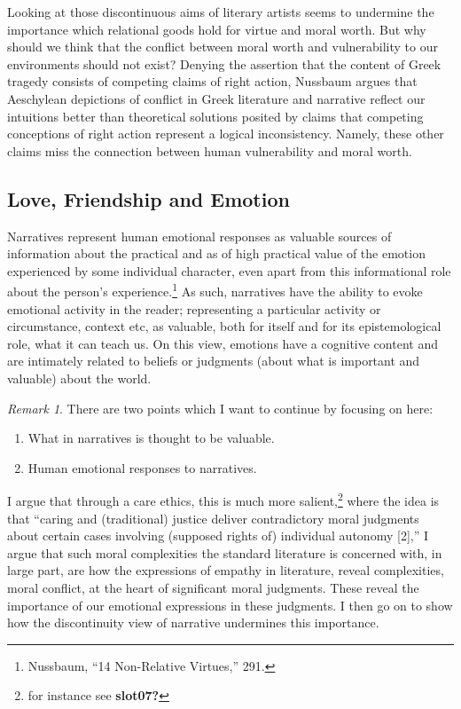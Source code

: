 \documentclass[
  12pt,
]{book}
\providecommand{\tightlist}{%
  \setlength{\itemsep}{0pt}\setlength{\parskip}{0pt}}
\providecommand{\tightlist}{%
  \setlength{\itemsep}{0pt}\setlength{\parskip}{0pt}}
\theoremstyle{definition}
\theoremstyle{definition}
\theoremstyle{definition}
\theoremstyle{definition}
\theoremstyle{remark}
\newtheorem*{remark}{Remark}
\begin{document}
Looking at those discontinuous aims of literary artists seems to undermine the importance which relational goods hold for virtue and moral worth. But why should we think that the conflict between moral worth and vulnerability to our environments should not exist? Denying the assertion that the content of Greek tragedy consists of competing claims of right action, Nussbaum argues that Aeschylean depictions of conflict in Greek literature and narrative reflect our intuitions better than theoretical solutions posited by claims that competing conceptions of right action represent a logical inconsistency. Namely, these other claims miss the connection between human vulnerability and moral worth.

\subsection*{Love, Friendship and Emotion}\label{love-friendship-and-emotion}

Narratives represent human emotional responses as valuable sources of information about the practical and as of high practical value of the emotion experienced by some individual character, even apart from this informational role about the person's experience.\footnote{Nussbaum, {``14 {Non-Relative Virtues},''} 291.} As such, narratives have the ability to evoke emotional activity in the reader; representing a particular activity or circumstance, context etc, as valuable, both for itself and for its epistemological role, what it can teach us. On this view, emotions have a cognitive content and are intimately related to beliefs or judgments (about what is important and valuable) about the world.

\begin{remark}

\noindent There are two points which I want to continue by focusing on here:

\begin{enumerate}
\def\labelenumi{\arabic{enumi}.}
\tightlist
\item
  What in narratives is thought to be valuable.
\item
  Human emotional responses to narratives.
\end{enumerate}

\end{remark}

I argue that through a care ethics, this is much more salient,\footnote{for instance see \textbf{slot07?}} where the idea is that ``caring and (traditional) justice deliver contradictory moral judgments about certain cases involving (supposed rights of) individual autonomy {[}2{]},'' I argue that such moral complexities the standard literature is concerned with, in large part, are how the expressions of empathy in literature, reveal complexities, moral conflict, at the heart of significant moral judgments. These reveal the importance of our emotional expressions in these judgments. I then go on to show how the discontinuity view of narrative undermines this importance.
\end{document}
